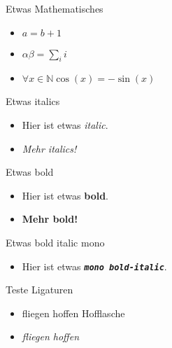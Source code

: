 \documentclass{beamer}
\begin{document}
\begin{frame}
    \begin{block}{Etwas Mathematisches}
        \begin{itemize}
            \item $a = b + 1$
            \item $\alpha \beta = \sum_i i$
            \item $\forall x \in \mathbb{N}\cos(x) = -\sin(x)$
        \end{itemize}
    \end{block}
\end{frame}

\begin{frame}
    \begin{block}{Etwas italics}
        \begin{itemize}
            \item Hier ist etwas \textit{italic}. 
            \item \textit{Mehr italics!}
        \end{itemize}
    \end{block}

    \begin{block}{Etwas bold}
        \begin{itemize}
            \item Hier ist etwas \textbf{bold}. 
            \item \textbf{Mehr bold!}
        \end{itemize}
    \end{block}
    
    \begin{block}{Etwas bold italic mono}
        \begin{itemize}
            \item Hier ist etwas \texttt{\textit{\textbf{mono bold-italic}}}. 
        \end{itemize}
    \end{block}
\end{frame}

\begin{frame}
    \begin{block}{Teste Ligaturen}
        \begin{itemize}
            \item fliegen hoffen Hofflasche
            \item \textit{fliegen hoffen}
        \end{itemize}
    \end{block}
\end{frame}
\end{document}
